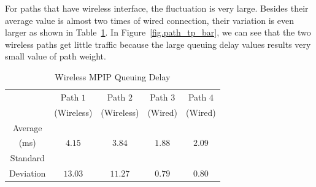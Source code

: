 



For paths that have wireless interface, the fluctuation is very large. Besides their average value is almost two times of wired connection, their variation is even larger as shown in Table~\ref{tb.wireless}. In Figure~\ref{fig.path_tp_bar}, we can see that the two wireless paths get little traffic because the large queuing delay values results very small value of path weight.


\begin{table}
\caption{\label{tb.wireless}Wireless MPIP Queuing Delay}
\centering
\begin{tabular}{|c|c|c|c|c|}
\hline
  & Path $1$   &  Path $2$   &  Path $3$ &  Path $4$\\
  & (Wireless) &  (Wireless) &  (Wired)  &  (Wired) \\
\hline
Average &   &   &   & \\
(ms) & $4.15$ & $3.84$ & $1.88$ & $2.09$ \\
\hline
Standard &   &   &   & \\
Deviation  & $13.03$ & $11.27$ & $0.79$ & $0.80$ \\
\hline
\end{tabular}
\end{table}

